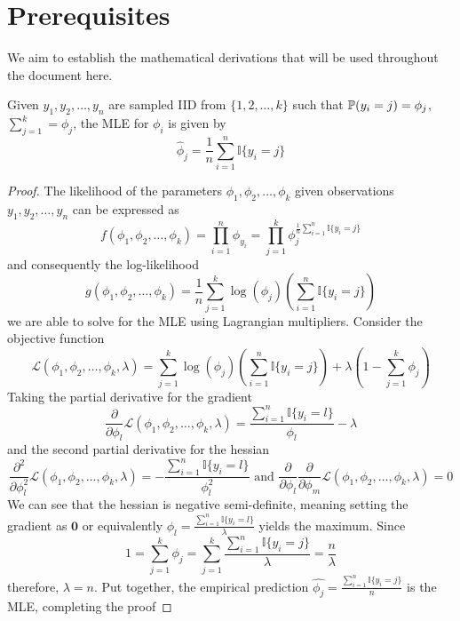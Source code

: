 \section{Prerequisites}
We aim to establish the mathematical derivations that will be used throughout the document here.
\begin{theorem}
    Given $y_1,y_2,\dots,y_n$ are sampled IID from $\{1,2,\dots,k\}$ such that $\mathbb{P}(y_i=j)=\phi_j$, $\sum_{j=1}^k=\phi_j$, the MLE for $\phi_i$ is given by
    \[
        \hat{\phi}_j = \frac{1}{n} \sum_{i=1}^n \mathbb{I}\{y_i=j\}
    \]
\end{theorem}
\begin{proof}
    The likelihood of the parameters $\phi_1,\phi_2,\dots,\phi_k$ given observations $y_1,y_2,\dots,y_n$ can be expressed as
    \[
    f(\phi_1,\phi_2,\dots,\phi_k) = \prod_{i=1}^n \phi_{y_i} = \prod_{j=1}^k \phi_{j} ^ {\frac{1}{n} \sum_{i=1}^n \mathbb{I}\{y_i=j\}}
    \]
    and consequently the log-likelihood
    \[
    g(\phi_1,\phi_2,\dots,\phi_k) = \frac{1}{n} \sum_{j=1}^k \log(\phi_{j}) \left(\sum_{i=1}^n \mathbb{I}\{y_i=j\}\right)
    \]
    we are able to solve for the MLE using Lagrangian multipliers. Consider the objective function 
    \[
    \mathcal{L}(\phi_1,\phi_2,\dots,\phi_k,\lambda) = \sum_{j=1}^k \log(\phi_{j}) \left(\sum_{i=1}^n \mathbb{I}\{y_i=j\}\right) + \lambda\left(1-\sum_{j=1}^k\phi_j\right)
    \]
    Taking the partial derivative for the gradient
    \[
    \frac{\partial}{\partial \phi_l} \mathcal{L}(\phi_1,\phi_2,\dots,\phi_k,\lambda) = \frac{\sum_{i=1}^n \mathbb{I}\{y_i=l\}}{\phi_l} - \lambda
    \]
    and the second partial derivative for the hessian
    \[
        \frac{\partial^2}{\partial \phi_l^2} \mathcal{L}(\phi_1,\phi_2,\dots,\phi_k,\lambda) = -\frac{\sum_{i=1}^n \mathbb{I}\{y_i=l\}}{\phi_l^2}
        \text{ and }
        \frac{\partial}{\partial \phi_l}\frac{\partial}{\partial \phi_m}\mathcal{L}(\phi_1,\phi_2,\dots,\phi_k,\lambda) = 0
    \]
    We can see that the hessian is negative semi-definite, meaning setting the gradient as $\mathbf{0}$ or equivalently $\phi_l=\frac{\sum_{i=1}^n \mathbb{I}\{y_i=l\}}{\lambda}$ yields the maximum. Since
    \[
        1 = \sum_{j=1}^k\phi_j = \sum_{j=1}^k \frac{\sum_{i=1}^n \mathbb{I}\{y_i=j\}}{\lambda} = \frac{n}{\lambda}
    \]
    therefore, $\lambda=n$. Put together, the empirical prediction $\hat{\phi_j} = \frac{\sum_{i=1}^n \mathbb{I}\{y_i=j\}}{n}$ is the MLE, completing the proof
\end{proof}

